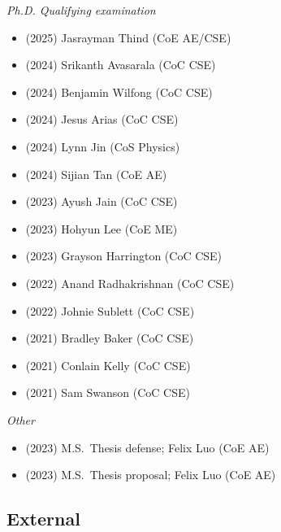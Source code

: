 \textit{Ph.D. Qualifying examination}
\vspace{-0.25cm}
\begin{multicols}{2}
\begin{itemize}
    \item (2025)  Jasrayman Thind (CoE AE/CSE)
    \item (2024)  Srikanth Avasarala (CoC CSE)
    \item (2024)  Benjamin Wilfong (CoC CSE)
    \item (2024)  Jesus Arias (CoC CSE)
    \item (2024)  Lynn Jin (CoS Physics)
    \item (2024)  Sijian Tan (CoE AE)
    \item (2023)  Ayush Jain (CoC CSE)
    \item (2023)  Hohyun Lee (CoE ME)
    \item (2023)  Grayson Harrington (CoC CSE)
    \item (2022)  Anand Radhakrishnan (CoC CSE)
    \item (2022)  Johnie Sublett (CoC CSE)
    \item (2021)  Bradley Baker (CoC CSE)
    \item (2021)  Conlain Kelly (CoC CSE)
    \item (2021)  Sam Swanson (CoC CSE)
\end{itemize}
\end{multicols}

\textit{Other}
\vspace{-0.1cm}
\begin{itemize}
    \item (2023) M.S.\  Thesis defense;  Felix Luo (CoE AE)
    \item (2023) M.S.\  Thesis proposal; Felix Luo (CoE AE)
\end{itemize}

\subsection{External}

